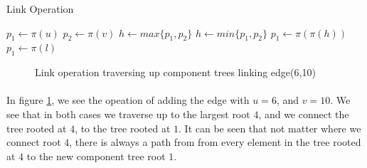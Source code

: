 \documentclass[]{article}
\begin{document}
 
  
\begin{algorithm}
\caption{Link Operation}\label{euclid}
\begin{algorithmic}[1]
\State $p_1 \gets \pi(u)$
\State $p_2 \gets \pi(v)$
  \State $h \gets max\{p_1,p_2\}$
  \State $h \gets min\{p_1,p_2\}$
   \Return
  \EndIf
  \State $p_1 \gets \pi(\pi(h))$
  \State $p_1 \gets \pi(l)$
\EndWhile\label{euclidendwhile}
\EndProcedure
\end{algorithmic}
\end{algorithm}

\begin{figure}[H]%
    \centering
    \qquad
    \caption{Link operation traversing up component trees linking edge(6,10)}%
    \label{fig-link}%
\end{figure}
 
  \paragraph{}
In figure \ref{fig-link}, we see the opeation of adding the edge with $u=6$, and $v=10$. We see that in both cases we traverse up to the largest root $4$, and we connect the tree rooted at $4$, to the tree rooted at $1$. It can be seen that not matter where we connect root $4$, there is always a path from from every element in the tree rooted at $4$ to the new component tree root $1$.
\end{document}
